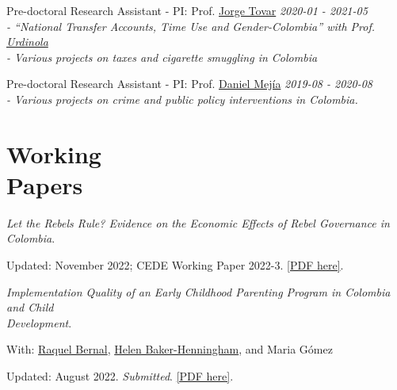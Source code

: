 \documentclass[margin,line]{res}
\newenvironment{list1}{
  \begin{list}{\ding{113}}{%
      \setlength{\itemsep}{0in}
      \setlength{\parsep}{0in} \setlength{\parskip}{0in}
      \setlength{\topsep}{0in} \setlength{\partopsep}{0in} 
      \setlength{\leftmargin}{0.17in}}}{\end{list}}
\begin{document}
\begin{resume}
\vspace{-.4cm}

{Pre-doctoral Research Assistant - PI: Prof. \href{https://sites.google.com/view/jorgetovar/home}{Jorge Tovar}} \hfill \emph{2020-01 - 2021-05} \\
{\em \footnotesize - ``National Transfer Accounts, Time Use and Gender-Colombia''  %
	with  Prof. \href{https://sites.google.com/site/piedadurdinola/}{Urdinola}}  \\
{\em \footnotesize - Various projects on taxes and cigarette smuggling in Colombia} 

\vspace{-.1cm}
{Pre-doctoral Research Assistant - PI: Prof. \href{https://sites.google.com/view/danielmejial}{Daniel Mejía}} \hfill \emph{2019-08 - 2020-08} \\
{\em \footnotesize - Various projects on crime and public policy interventions in Colombia.} 





\vspace{.1cm}

\section{\sc Working \\ Papers}

\textit{Let the Rebels Rule? Evidence on the Economic Effects of Rebel Governance in Colombia}.
\begin{list1}
    \item[] Updated: November 2022; CEDE Working Paper 2022-3. \href{https://santiago-perezc.github.io/documents/masters-thesis.pdf}{[PDF here]}. 
\end{list1}


\textit{Implementation Quality of an Early Childhood Parenting Program in Colombia and Child \\ Development}.  
\begin{list1}
    \item[] With: \href{https://sites.google.com/view/raquelbernal}{Raquel Bernal}, \href{https://research.bangor.ac.uk/portal/en/researchers/helen-henningham(ab5999a9-22af-4394-b4f4-89dff9971ad1).html}{Helen Baker-Henningham}, and Maria Gómez  
    \item[] Updated: August 2022. \emph{Submitted}. \href{https://santiago-perezc.github.io/documents/Pediatrics_Submitted.pdf}{[PDF here]}.
\end{list1}



\end{resume}
\end{document}
